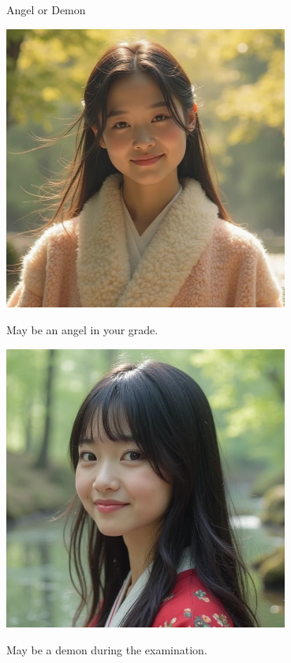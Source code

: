 \documentclass{beamer}
\begin{document}
\begin{frame}{Angel or Demon}
\begin{minipage}{0.45\textwidth}
\begin{center}
\includegraphics[width=0.7\textwidth]{heal.png}
\end{center}
\begin{center}
May be an angel in your grade.
\end{center}
\end{minipage}
\hfill
\begin{minipage}{0.45\textwidth}
\begin{center}
\includegraphics[width=0.7\textwidth]{kill.png}
\end{center}
\begin{center}
May be a demon during the examination.
\end{center}
\end{minipage}
\end{frame}
\end{document}
